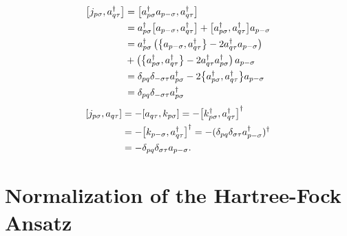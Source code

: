 \documentclass[Dual]{msu-thesis}
\begin{document}
\begin{appendices}
\begin{align}
\label{kad}
\comm{j_{p\sigma}}{a^{\dagger}_{q\tau}}
&=
\comm{a^{\dagger}_{p\sigma}a_{p-\sigma}}{a^{\dagger}_{q\tau}}
\nonumber
\\
&=
a^{\dagger}_{p\sigma}\comm{a_{p-\sigma}}{a^{\dagger}_{q\tau}}
+
\comm{a^{\dagger}_{p\sigma}}{a^{\dagger}_{q\tau}}a_{ p-\sigma}
\nonumber
\\
&=
a^{\dagger}_{p\sigma}\left(\acomm{a_{p-\sigma}}{a^{\dagger}_{q\tau}}-2a^{\dagger}_{q\tau}a_{p-\sigma}\right)
\nonumber
\\
&+
\left(\acomm{a^{\dagger}_{p\sigma}}{a^{\dagger}_{q\tau}}-2a^{\dagger}_{q\tau}a^{\dagger}_{p\sigma}\right)a_{p-\sigma}
\nonumber
\\
&=
\delta_{pq}\delta_{-\sigma\tau}a^{\dagger}_{p\sigma}-2\acomm{a^{\dagger}_{p\sigma}}{a^{\dagger}_{q\tau}}a_{p-\sigma}
\nonumber
\\
&=
\delta_{pq}\delta_{-\sigma\tau}a^{\dagger}_{p\sigma}
\end{align}
\begin{align}
\label{ka}
\comm{j_{p\sigma}}{a_{q\tau}}
\nonumber
&=
-\comm{a_{q\tau}}{k_{p\sigma}}
\nonumber
=
-\comm{k_{p\sigma}^{\dagger}}{a^{\dagger}_{q\tau}}^{\dagger}
\nonumber
\\
&=
-\comm{k_{p-\sigma}}{a^{\dagger}_{q\tau}}^{\dagger}
\nonumber
=
-(\delta_{pq}\delta_{\sigma\tau}a^{\dagger}_{p-\sigma})^{\dagger}
\nonumber
\\
&=
-\delta_{pq}\delta_{\sigma\tau}a_{p-\sigma}
.\end{align}

\chapter{Normalization of the Hartree-Fock Ansatz}
\label{appendix:normalization_of_the_hartree-fock_ansatz}


\end{appendices}
\end{document}
